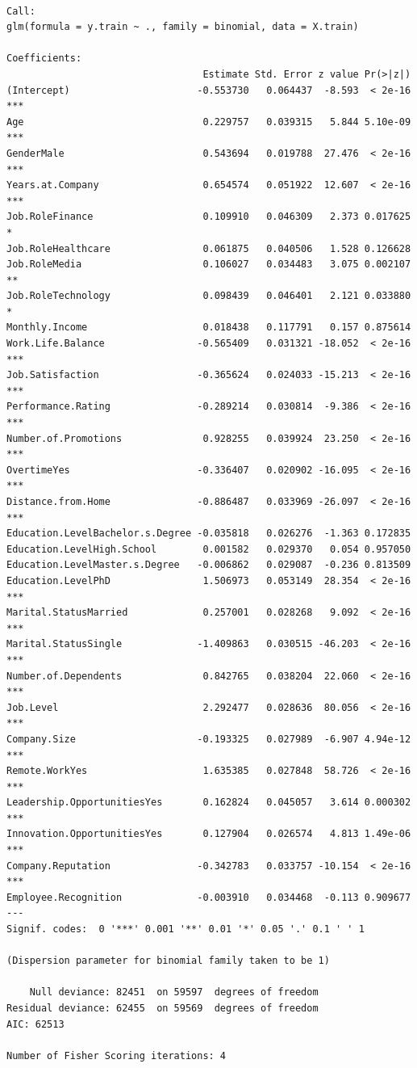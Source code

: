 \documentclass[
  10pt,
  paper=a4,
  ,captions=tableheading
]{scrartcl}
\begin{document}
\begin{verbatim}

Call:
glm(formula = y.train ~ ., family = binomial, data = X.train)

Coefficients:
                                  Estimate Std. Error z value Pr(>|z|)    
(Intercept)                      -0.553730   0.064437  -8.593  < 2e-16 ***
Age                               0.229757   0.039315   5.844 5.10e-09 ***
GenderMale                        0.543694   0.019788  27.476  < 2e-16 ***
Years.at.Company                  0.654574   0.051922  12.607  < 2e-16 ***
Job.RoleFinance                   0.109910   0.046309   2.373 0.017625 *  
Job.RoleHealthcare                0.061875   0.040506   1.528 0.126628    
Job.RoleMedia                     0.106027   0.034483   3.075 0.002107 ** 
Job.RoleTechnology                0.098439   0.046401   2.121 0.033880 *  
Monthly.Income                    0.018438   0.117791   0.157 0.875614    
Work.Life.Balance                -0.565409   0.031321 -18.052  < 2e-16 ***
Job.Satisfaction                 -0.365624   0.024033 -15.213  < 2e-16 ***
Performance.Rating               -0.289214   0.030814  -9.386  < 2e-16 ***
Number.of.Promotions              0.928255   0.039924  23.250  < 2e-16 ***
OvertimeYes                      -0.336407   0.020902 -16.095  < 2e-16 ***
Distance.from.Home               -0.886487   0.033969 -26.097  < 2e-16 ***
Education.LevelBachelor.s.Degree -0.035818   0.026276  -1.363 0.172835    
Education.LevelHigh.School        0.001582   0.029370   0.054 0.957050    
Education.LevelMaster.s.Degree   -0.006862   0.029087  -0.236 0.813509    
Education.LevelPhD                1.506973   0.053149  28.354  < 2e-16 ***
Marital.StatusMarried             0.257001   0.028268   9.092  < 2e-16 ***
Marital.StatusSingle             -1.409863   0.030515 -46.203  < 2e-16 ***
Number.of.Dependents              0.842765   0.038204  22.060  < 2e-16 ***
Job.Level                         2.292477   0.028636  80.056  < 2e-16 ***
Company.Size                     -0.193325   0.027989  -6.907 4.94e-12 ***
Remote.WorkYes                    1.635385   0.027848  58.726  < 2e-16 ***
Leadership.OpportunitiesYes       0.162824   0.045057   3.614 0.000302 ***
Innovation.OpportunitiesYes       0.127904   0.026574   4.813 1.49e-06 ***
Company.Reputation               -0.342783   0.033757 -10.154  < 2e-16 ***
Employee.Recognition             -0.003910   0.034468  -0.113 0.909677    
---
Signif. codes:  0 '***' 0.001 '**' 0.01 '*' 0.05 '.' 0.1 ' ' 1

(Dispersion parameter for binomial family taken to be 1)

    Null deviance: 82451  on 59597  degrees of freedom
Residual deviance: 62455  on 59569  degrees of freedom
AIC: 62513

Number of Fisher Scoring iterations: 4
\end{verbatim}
\end{document}
